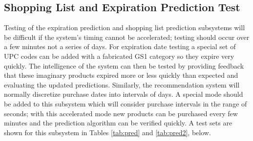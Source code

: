 \documentclass[11pt,letterpaper]{article}
\begin{document}
\subsection{Shopping List and Expiration Prediction Test}
Testing of the expiration prediction and shopping list prediction subsystems will be difficult if the system's timing cannot be accelerated; testing should occur over a few minutes not a series of days. For expiration date testing a special set of UPC codes can be added with a fabricated GS1 category so they expire very quickly. The intelligence of the system can then be tested by providing feedback that these imaginary products expired more or less quickly than expected and evaluating the updated predictions. Similarly, the recommendation system will normally discretize purchase dates into intervals of days. A special mode should be added to this subsystem which will consider purchase intervals in the range of seconds; with this accelerated mode new products can be purchased every few minutes and the prediction algorithm can be verified quickly. A test sets are shown for this subsystem in Tables \ref{tab:pred} and \ref{tab:pred2}, below.
\end{document}
